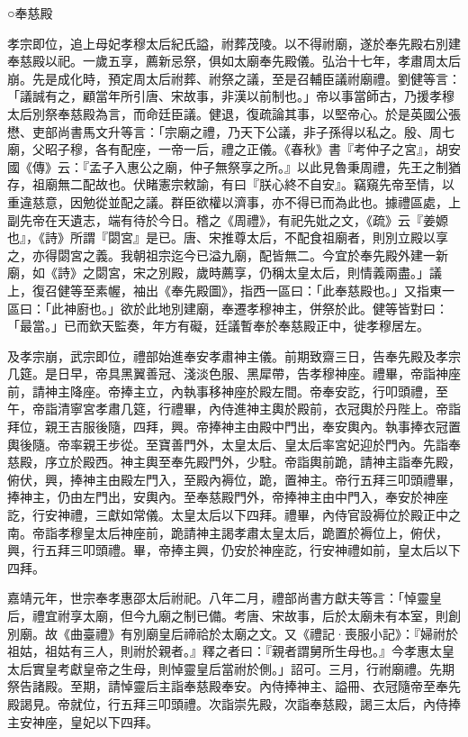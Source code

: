 ○奉慈殿

孝宗即位，追上母妃孝穆太后紀氏謚，祔葬茂陵。以不得祔廟，遂於奉先殿右別建奉慈殿以祀。一歲五享，薦新忌祭，俱如太廟奉先殿儀。弘治十七年，孝肅周太后崩。先是成化時，預定周太后祔葬、祔祭之議，至是召輔臣議祔廟禮。劉健等言：「議誠有之，顧當年所引唐、宋故事，非漢以前制也。」帝以事當師古，乃援孝穆太后別祭奉慈殿為言，而命廷臣議。健退，復疏論其事，以堅帝心。於是英國公張懋、吏部尚書馬文升等言：「宗廟之禮，乃天下公議，非子孫得以私之。殷、周七廟，父昭子穆，各有配座，一帝一后，禮之正儀。《春秋》書『考仲子之宮』，胡安國《傳》云：『孟子入惠公之廟，仲子無祭享之所。』以此見魯秉周禮，先王之制猶存，祖廟無二配故也。伏睹憲宗敕諭，有曰『朕心終不自安』。竊窺先帝至情，以重違慈意，因勉從並配之議。群臣欲權以濟事，亦不得已而為此也。據禮區處，上副先帝在天遺志，端有待於今日。稽之《周禮》，有祀先妣之文，《疏》云『姜嫄也』，《詩》所謂『閟宮』是已。唐、宋推尊太后，不配食祖廟者，則別立殿以享之，亦得閟宮之義。我朝祖宗迄今已溢九廟，配皆無二。今宜於奉先殿外建一新廟，如《詩》之閟宮，宋之別殿，歲時薦享，仍稱太皇太后，則情義兩盡。」議上，復召健等至素幄，袖出《奉先殿圖》，指西一區曰：「此奉慈殿也。」又指東一區曰：「此神廚也。」欲於此地別建廟，奉遷孝穆神主，併祭於此。健等皆對曰：「最當。」已而欽天監奏，年方有礙，廷議暫奉於奉慈殿正中，徙孝穆居左。

及孝宗崩，武宗即位，禮部始進奉安孝肅神主儀。前期致齋三日，告奉先殿及孝宗几筵。是日早，帝具黑翼善冠、淺淡色服、黑犀帶，告孝穆神座。禮畢，帝詣神座前，請神主降座。帝捧主立，內執事移神座於殿左間。帝奉安訖，行叩頭禮，至午，帝詣清寧宮孝肅几筵，行禮畢，內侍進神主輿於殿前，衣冠輿於丹陛上。帝詣拜位，親王吉服後隨，四拜，興。帝捧神主由殿中門出，奉安輿內。執事捧衣冠置輿後隨。帝率親王步從。至寶善門外，太皇太后、皇太后率宮妃迎於門內。先詣奉慈殿，序立於殿西。神主輿至奉先殿門外，少駐。帝詣輿前跪，請神主詣奉先殿，俯伏，興，捧神主由殿左門入，至殿內褥位，跪，置神主。帝行五拜三叩頭禮畢，捧神主，仍由左門出，安輿內。至奉慈殿門外，帝捧神主由中門入，奉安於神座訖，行安神禮，三獻如常儀。太皇太后以下四拜。禮畢，內侍官設褥位於殿正中之南。帝詣孝穆皇太后神座前，跪請神主謁孝肅太皇太后，跪置於褥位上，俯伏，興，行五拜三叩頭禮。畢，帝捧主興，仍安於神座訖，行安神禮如前，皇太后以下四拜。

嘉靖元年，世宗奉孝惠邵太后祔祀。八年二月，禮部尚書方獻夫等言：「悼靈皇后，禮宜祔享太廟，但今九廟之制已備。考唐、宋故事，后於太廟未有本室，則創別廟。故《曲臺禮》有別廟皇后禘祫於太廟之文。又《禮記·喪服小記》：『婦祔於祖姑，祖姑有三人，則祔於親者。』釋之者曰：『親者謂舅所生母也。』今孝惠太皇太后實皇考獻皇帝之生母，則悼靈皇后當祔於側。」詔可。三月，行祔廟禮。先期祭告諸殿。至期，請悼靈后主詣奉慈殿奉安。內侍捧神主、謚冊、衣冠隨帝至奉先殿謁見。帝就位，行五拜三叩頭禮。次詣崇先殿，次詣奉慈殿，謁三太后，內侍捧主安神座，皇妃以下四拜。

